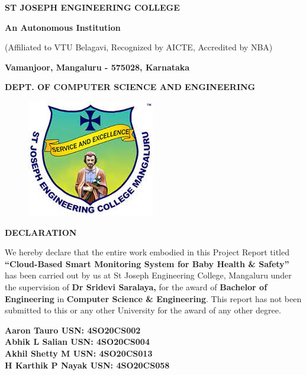 \documentclass[12pt,a4paper]{report}
\begin{document}
\centering
\LARGE \textbf{ST JOSEPH ENGINEERING COLLEGE}
\par
\Large \textbf{An Autonomous Institution}
\par \large{(Affiliated to VTU Belagavi, Recognized by AICTE, Accredited by NBA)}
\par \vspace{3pt}
\large \textbf{Vamanjoor, Mangaluru - 575028, Karnataka}
\par \vspace{12pt}  
\par
\large \textbf{DEPT. OF COMPUTER SCIENCE AND ENGINEERING}
\par
\begin{figure}[hbtp]
\centering
\includegraphics[scale=0.5]{./pic/sjeclogo}
\end{figure}

\begin{center}
{\Large \textbf{DECLARATION}}
\end{center}
\justifying
\par


\noindent We hereby declare that the entire work embodied in this Project Report titled
\textbf{``Cloud-Based Smart Monitoring System for Baby Health \& Safety''} has been carried out by us at St Joseph Engineering College, Mangaluru under the supervision of \textbf{Dr Sridevi Saralaya,} for the award of \textbf{Bachelor of Engineering} in \textbf{Computer Science \& Engineering}. This report has not been submitted to this or any other University  for the award of any  other degree. \\
\vspace{0.25in}

\begin{flushleft}
\textbf{Aaron Tauro  USN: 4SO20CS002}\\
\vspace{0.1in}
\textbf{Abhik L Salian  USN: 4SO20CS004}\\
\vspace{0.1in}
\textbf{Akhil Shetty M  USN: 4SO20CS013}\\
\vspace{0.1in}
\textbf{H Karthik P Nayak  USN: 4SO20CS058}\\
\end{flushleft}
\end{document}
